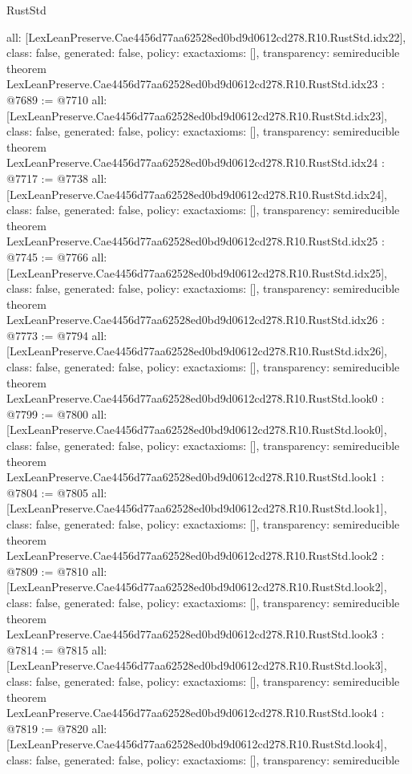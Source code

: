 \begin{lexlean}{RustStd}
\begin{coremodule}
{  all: [LexLeanPreserve.Cae4456d77aa62528ed0bd9d0612cd278.R10.RustStd.idx22],
  class: false,
  generated: false,
  policy: exact{axioms: []},
  transparency: semireducible
}
theorem LexLeanPreserve.Cae4456d77aa62528ed0bd9d0612cd278.R10.RustStd.idx23 : @7689 := @7710 {
  all: [LexLeanPreserve.Cae4456d77aa62528ed0bd9d0612cd278.R10.RustStd.idx23],
  class: false,
  generated: false,
  policy: exact{axioms: []},
  transparency: semireducible
}
theorem LexLeanPreserve.Cae4456d77aa62528ed0bd9d0612cd278.R10.RustStd.idx24 : @7717 := @7738 {
  all: [LexLeanPreserve.Cae4456d77aa62528ed0bd9d0612cd278.R10.RustStd.idx24],
  class: false,
  generated: false,
  policy: exact{axioms: []},
  transparency: semireducible
}
theorem LexLeanPreserve.Cae4456d77aa62528ed0bd9d0612cd278.R10.RustStd.idx25 : @7745 := @7766 {
  all: [LexLeanPreserve.Cae4456d77aa62528ed0bd9d0612cd278.R10.RustStd.idx25],
  class: false,
  generated: false,
  policy: exact{axioms: []},
  transparency: semireducible
}
theorem LexLeanPreserve.Cae4456d77aa62528ed0bd9d0612cd278.R10.RustStd.idx26 : @7773 := @7794 {
  all: [LexLeanPreserve.Cae4456d77aa62528ed0bd9d0612cd278.R10.RustStd.idx26],
  class: false,
  generated: false,
  policy: exact{axioms: []},
  transparency: semireducible
}
theorem LexLeanPreserve.Cae4456d77aa62528ed0bd9d0612cd278.R10.RustStd.look0 : @7799 := @7800 {
  all: [LexLeanPreserve.Cae4456d77aa62528ed0bd9d0612cd278.R10.RustStd.look0],
  class: false,
  generated: false,
  policy: exact{axioms: []},
  transparency: semireducible
}
theorem LexLeanPreserve.Cae4456d77aa62528ed0bd9d0612cd278.R10.RustStd.look1 : @7804 := @7805 {
  all: [LexLeanPreserve.Cae4456d77aa62528ed0bd9d0612cd278.R10.RustStd.look1],
  class: false,
  generated: false,
  policy: exact{axioms: []},
  transparency: semireducible
}
theorem LexLeanPreserve.Cae4456d77aa62528ed0bd9d0612cd278.R10.RustStd.look2 : @7809 := @7810 {
  all: [LexLeanPreserve.Cae4456d77aa62528ed0bd9d0612cd278.R10.RustStd.look2],
  class: false,
  generated: false,
  policy: exact{axioms: []},
  transparency: semireducible
}
theorem LexLeanPreserve.Cae4456d77aa62528ed0bd9d0612cd278.R10.RustStd.look3 : @7814 := @7815 {
  all: [LexLeanPreserve.Cae4456d77aa62528ed0bd9d0612cd278.R10.RustStd.look3],
  class: false,
  generated: false,
  policy: exact{axioms: []},
  transparency: semireducible
}
theorem LexLeanPreserve.Cae4456d77aa62528ed0bd9d0612cd278.R10.RustStd.look4 : @7819 := @7820 {
  all: [LexLeanPreserve.Cae4456d77aa62528ed0bd9d0612cd278.R10.RustStd.look4],
  class: false,
  generated: false,
  policy: exact{axioms: []},
  transparency: semireducible
}
\end{coremodule}
\end{lexlean}
